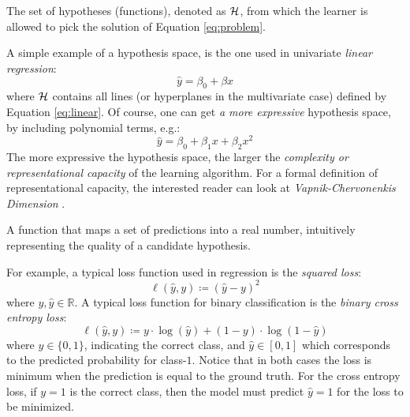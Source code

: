 \begin{definition}
	The set of hypotheses (functions), denoted as $\mathcal{H}$, from which the
	learner is allowed to pick the solution of Equation \ref{eq:problem}.
\end{definition}

A simple example of a hypothesis space, is the one used in univariate
\emph{linear regression}:
\begin{equation}
	\label{eq:linear}
	\hat{y} = \beta_0 + \beta x
\end{equation}
where $\mathcal{H}$ contains all lines (or hyperplanes in the multivariate case)
defined by Equation \ref{eq:linear}. Of course, one can get \emph{a
more expressive} hypothesis space, by including polynomial terms, e.g.:
\begin{equation}
	\label{eq:polynomial}
	\hat{y} = \beta_0 + \beta_1 x + \beta_2 x^2
\end{equation}
The more expressive the hypothesis space, the larger the \emph{complexity or
representational capacity} of the learning
algorithm. For a formal definition of representational capacity, the interested
reader can look at \emph{Vapnik-Chervonenkis
Dimension} \parencite{statlearn}.

\begin{definition}
	A function that maps a set of predictions into a real number, intuitively
	representing the quality of a candidate hypothesis.
\end{definition}

For example, a typical loss function used in regression is the \emph{squared
loss}:
\begin{equation}
	\label{eq:squared_loss}
	\ell(\hat{y}, y) \coloneqq (\hat{y} - y)^2
\end{equation}
where $y, \hat{y} \in \mathbb{R}$. A typical loss function for binary
classification is the \emph{binary cross entropy
loss}:
\begin{equation}
	\label{eq:cross_entropy}
	\ell(\hat{y}, y) \coloneqq y \cdot \log (\hat{y})
	+ (1 - y) \cdot \log (1 - \hat{y})
\end{equation}
where $y \in \{0, 1\}$, indicating the correct class, and $\hat{y} \in [0, 1]$
which corresponds to the predicted probability for class-$1$. Notice that in
both cases the loss is minimum when the prediction is equal to the ground truth.
For the cross entropy loss, if $y=1$ is the correct class, then the model must
predict $\hat{y}=1$ for the loss to be minimized.

